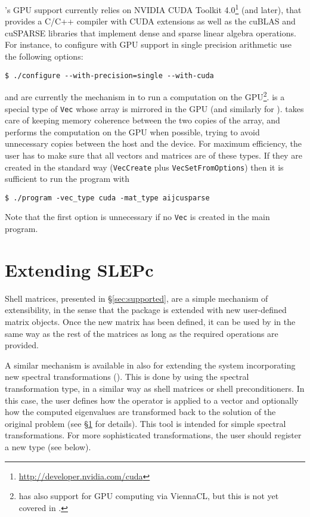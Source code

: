\slepc's GPU support currently relies on NVIDIA CUDA Toolkit 4.0\footnote{\url{http://developer.nvidia.com/cuda}} (and later), that provides a C/C++ compiler with CUDA extensions as well as the cuBLAS and cuSPARSE libraries that implement dense and sparse linear algebra operations. For instance, to configure \petsc with GPU support in single precision arithmetic use the following options:
	\begin{Verbatim}[fontsize=\small]
	$ ./configure --with-precision=single --with-cuda
	\end{Verbatim}

 and  are currently the mechanism in \petsc to run a computation on the GPU\footnote{\petsc has also support for GPU computing via ViennaCL, but this is not yet covered in \slepc.}.  is a special type of \texttt{Vec} whose array is mirrored in the GPU (and similarly for ). \petsc takes care of keeping memory coherence between the two copies of the array, and performs the computation on the GPU when possible, trying to avoid unnecessary copies between the host and the device. For maximum efficiency, the user has to make sure that all vectors and matrices are of these types. If they are created in the standard way (\texttt{VecCreate} plus \texttt{VecSetFromOptions}) then it is sufficient to run the \slepc program with
	\begin{Verbatim}[fontsize=\small]
	$ ./program -vec_type cuda -mat_type aijcusparse
	\end{Verbatim}
Note that the first option is unnecessary if no \texttt{Vec} is created in the main program.

\section{Extending SLEPc}
\label{sec:shell}

	Shell matrices, presented in \S\ref{sec:supported}, are a simple mechanism of extensibility, in the sense that the package is extended with new user-defined matrix objects. Once the new matrix has been defined, it can be used by \slepc in the same way as the rest of the matrices as long as the required operations are provided.

	A similar mechanism is available in \slepc also for extending the system incorporating new spectral transformations (). This is done by using the  spectral transformation type, in a similar way as shell matrices or shell preconditioners. In this case, the user defines how the operator is applied to a vector and optionally how the computed eigenvalues are transformed back to the solution of the original problem (see \S\ref{sec:shell} for details). This tool is intended for simple spectral transformations. For more sophisticated transformations, the user should register a new  type (see below).

